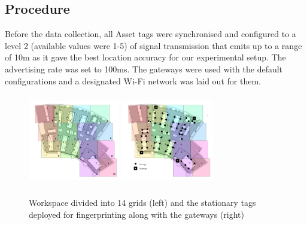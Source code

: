 \documentclass[acmtog]{acmart}
\begin{document}
\subsection{Procedure}
Before the data collection, all Asset tags were synchronised and configured to a level 2 (available values were 1-5) of signal transmission that emits up to a range of 10m as it gave the best location accuracy for our experimental setup. The advertising rate was set to 100ms. The gateways were used with the default configurations and a designated Wi-Fi network was laid out for them. 
\begin{figure}[h]
  \centering
  \includegraphics[width=4cm,height=4cm,keepaspectratio]{grids.png}
  \includegraphics[width=4cm,height=4cm,keepaspectratio]{sensors_grids.png}
  \caption{Workspace divided into 14 grids (left) and the stationary tags deployed for fingerprinting along with the gateways (right)}
  \label{Memkogrids}
  \end{figure}
\end{document}
